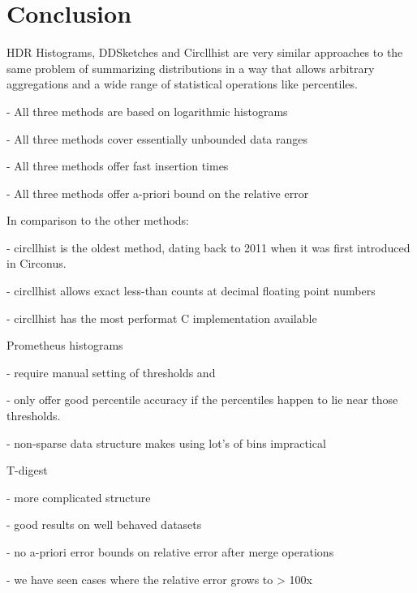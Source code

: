 \documentclass{article}
\theoremstyle{plain}
\theoremstyle{remark}
\begin{document}
\section{Conclusion}

HDR Histograms, DDSketches and Circllhist are very similar approaches to the same problem of
summarizing distributions in a way that allows arbitrary aggregations and a wide range of
statistical operations like percentiles.

- All three methods are based on logarithmic histograms

- All three methods cover essentially unbounded data ranges

- All three methods offer fast insertion times

- All three methods offer a-priori bound on the relative error

In comparison to the other methods:

- circllhist is the oldest method, dating back to 2011 when it was first introduced in Circonus.

- circllhist allows exact less-than counts at decimal floating point numbers

- circllhist has the most performat C implementation available

Prometheus histograms

- require manual setting of thresholds and

- only offer good percentile accuracy if the percentiles happen to lie near those thresholds.

- non-sparse data structure makes using lot's of bins impractical

T-digest

- more complicated structure

- good results on well behaved datasets

- no a-priori error bounds on relative error after merge operations

- we have seen cases where the relative error grows to > 100x
\end{document}

